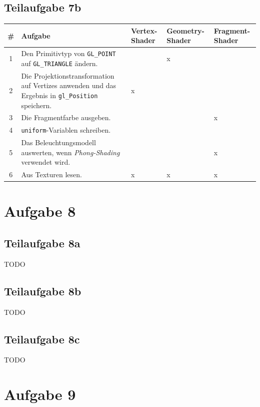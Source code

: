 \documentclass[a4paper]{scrartcl}
\begin{document}
\subsection*{Teilaufgabe 7b}
\begin{tabular}{cp{8cm}lll}\toprule
\#& Aufgabe    
            &  Vertex-Shader     & Geometry-Shader   &   Fragment-Shader \\\midrule
1 & Den Primitivtyp von \texttt{GL\_POINT} auf \texttt{GL\_TRIANGLE} ändern.
            & ~                  & x                 & ~     \\
2 & Die Projektionstransformation auf Vertizes anwenden und das Ergebnis in \texttt{gl\_Position} speichern.
            & x                  & ~                 & ~     \\
3 & Die Fragmentfarbe ausgeben.
            & ~                  & ~                 & x     \\
4 & \texttt{uniform}-Variablen schreiben.
            & ~                  & ~                 & ~     \\
5 & Das Beleuchtungsmodell auswerten, wenn \textit{Phong-Shading} verwendet wird.
            & ~                  & ~                 & x     \\
6 & Aus Texturen lesen.
            & x                  & x                 & x     \\\bottomrule
\end{tabular}


\section*{Aufgabe 8}
\subsection*{Teilaufgabe 8a}
TODO
\subsection*{Teilaufgabe 8b}
TODO
\subsection*{Teilaufgabe 8c}
TODO

\section*{Aufgabe 9}
\inputminted[linenos, numbersep=5pt, tabsize=4, frame=lines, label=keyframing.vert]{glsl}{keyframing.vert}
\end{document}
